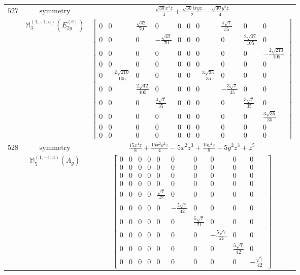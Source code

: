 \documentclass[fleqn,8pt,landscape]{jsarticle}
\begin{document}
\begin{longtable}{ccc}
$ 527 $ & $ \text{symmetry} $ & $ \frac{\sqrt{30} x^{2} z}{4} + \frac{\sqrt{30} i x y z}{2} - \frac{\sqrt{30} y^{2} z}{4} $ \\
$  $ & $ \mathbb{M}_{3}^{(1,-1;a)}(E_{2g}^{(b)}) $ & $ \begin{bmatrix} 0 & 0 & \frac{\sqrt{42}}{70} & 0 & 0 & 0 & 0 & \frac{4 \sqrt{7}}{35} & 0 & 0 \\ 0 & 0 & 0 & - \frac{\sqrt{42}}{70} & 0 & 0 & 0 & 0 & \frac{2 \sqrt{42}}{105} & 0 \\ 0 & 0 & 0 & 0 & 0 & 0 & 0 & 0 & 0 & - \frac{2 \sqrt{210}}{105} \\ 0 & 0 & 0 & 0 & 0 & 0 & 0 & 0 & 0 & 0 \\ 0 & - \frac{2 \sqrt{210}}{105} & 0 & 0 & 0 & 0 & - \frac{3 \sqrt{35}}{35} & 0 & 0 & 0 \\ 0 & 0 & \frac{2 \sqrt{42}}{105} & 0 & 0 & 0 & 0 & - \frac{3 \sqrt{7}}{35} & 0 & 0 \\ 0 & 0 & 0 & \frac{4 \sqrt{7}}{35} & 0 & 0 & 0 & 0 & \frac{3 \sqrt{7}}{35} & 0 \\ 0 & 0 & 0 & 0 & 0 & 0 & 0 & 0 & 0 & \frac{3 \sqrt{35}}{35} \\ 0 & 0 & 0 & 0 & 0 & 0 & 0 & 0 & 0 & 0 \\ 0 & 0 & 0 & 0 & 0 & 0 & 0 & 0 & 0 & 0 \end{bmatrix} $ \\ \hline
$ 528 $ & $ \text{symmetry} $ & $ \frac{15 x^{4} z}{8} + \frac{15 x^{2} y^{2} z}{4} - 5 x^{2} z^{3} + \frac{15 y^{4} z}{8} - 5 y^{2} z^{3} + z^{5} $ \\
$  $ & $ \mathbb{M}_{5}^{(1,-1;a)}(A_{g}) $ & $ \begin{bmatrix} 0 & 0 & 0 & 0 & 0 & 0 & 0 & 0 & 0 & 0 \\ 0 & 0 & 0 & 0 & 0 & 0 & 0 & 0 & 0 & 0 \\ 0 & 0 & 0 & 0 & 0 & 0 & 0 & 0 & 0 & 0 \\ 0 & 0 & 0 & 0 & 0 & 0 & 0 & 0 & 0 & 0 \\ 0 & 0 & 0 & 0 & \frac{\sqrt{7}}{42} & 0 & 0 & 0 & 0 & 0 \\ 0 & 0 & 0 & 0 & 0 & - \frac{5 \sqrt{7}}{42} & 0 & 0 & 0 & 0 \\ 0 & 0 & 0 & 0 & 0 & 0 & \frac{5 \sqrt{7}}{21} & 0 & 0 & 0 \\ 0 & 0 & 0 & 0 & 0 & 0 & 0 & - \frac{5 \sqrt{7}}{21} & 0 & 0 \\ 0 & 0 & 0 & 0 & 0 & 0 & 0 & 0 & \frac{5 \sqrt{7}}{42} & 0 \\ 0 & 0 & 0 & 0 & 0 & 0 & 0 & 0 & 0 & - \frac{\sqrt{7}}{42} \end{bmatrix} $ \\ \hline

\end{longtable}
\end{document}
